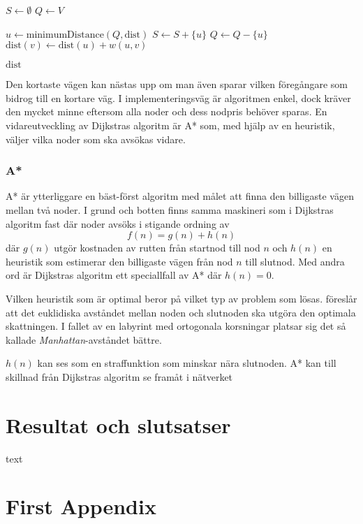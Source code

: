 \documentclass[11pt]{article}
\begin{document}
\begin{flushleft}
\begin{algorithm}
\begin{algorithmic}[1]
			\State $S \gets \emptyset$
			\State $Q \gets V$
			
				\State $u \gets \textrm{minimumDistance}(Q,\textrm{dist})$%
				\State $S \gets S +  \{ u\}$
				\State $Q \gets Q - \{ u\}$
						\State $\textrm{dist}(v) \gets \text{dist}(u) + w(u,v)$
					\EndIf
				\EndFor
			\EndWhile
			
			\Return $\textrm{dist}$
		\EndFunction
	\end{algorithmic}
\end{algorithm}

Den kortaste vägen kan nästas upp om man även sparar vilken föregångare som bidrog till en kortare väg. I implementeringsväg är algoritmen enkel, dock kräver den mycket minne eftersom alla noder och dess nodpris behöver sparas. En vidareutveckling av Dijkstras algoritm är A* som, med hjälp av en heuristik, väljer vilka noder som ska avsökas vidare.

\subsubsection{A*}
A* är ytterliggare en bäst-först algoritm med målet att finna den billigaste vägen mellan två noder. I grund och botten finns samma maskineri som i Dijkstras algoritm fast där noder avsöks i stigande ordning av
\begin{equation*}
	f(n) = g(n) + h(n)
\end{equation*}
där $g(n)$ utgör kostnaden av rutten från startnod till nod $n$ och $h(n)$ en heuristik som estimerar den billigaste vägen från nod $n$ till slutnod. Med andra ord är Dijkstras algoritm ett speciallfall av A* där $h(n) = 0$.

Vilken heuristik som är optimal beror på vilket typ av problem som lösas. \cite{aStar} föreslår att det euklidiska avståndet mellan noden och slutnoden ska utgöra den optimala skattningen. I fallet av en labyrint med ortogonala korsningar platsar sig det så kallade \emph{Manhattan}-avståndet bättre.

$h(n)$ kan ses som en straffunktion som minskar nära slutnoden. A* kan till skillnad från Dijkstras algoritm se framåt i nätverket
\pagebreak
\section{Resultat och slutsatser}
text

\pagebreak
{}



\pagebreak
\appendix
\section{First Appendix}

\end{flushleft}
\end{document}
